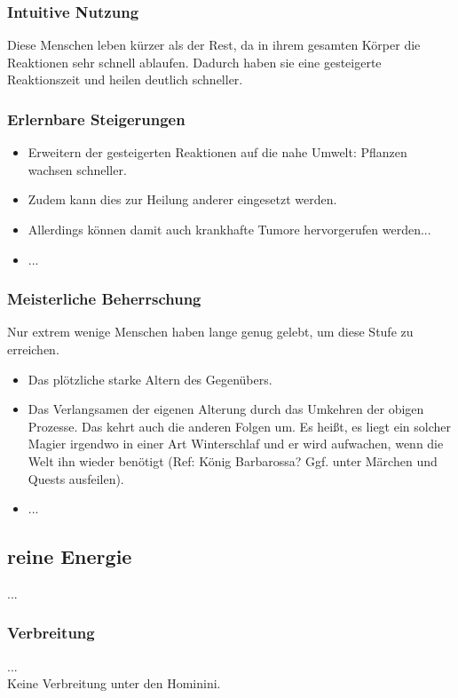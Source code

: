 \subsubsection{Intuitive Nutzung}
Diese Menschen leben kürzer als der Rest, da in ihrem gesamten Körper die Reaktionen sehr schnell ablaufen. Dadurch haben sie eine gesteigerte Reaktionszeit und heilen deutlich schneller.

\subsubsection{Erlernbare Steigerungen}
\begin{itemize}
	\item Erweitern der gesteigerten Reaktionen auf die nahe Umwelt: Pflanzen wachsen schneller.
	\item Zudem kann dies zur Heilung anderer eingesetzt werden.
	\item Allerdings können damit auch krankhafte Tumore hervorgerufen werden... 
	\item ...
\end{itemize}

\subsubsection{Meisterliche Beherrschung} 
Nur extrem wenige Menschen haben lange genug gelebt, um diese Stufe zu erreichen.
\begin{itemize}
	\item Das plötzliche starke Altern des Gegenübers.
	\item Das Verlangsamen der eigenen Alterung durch das Umkehren der obigen Prozesse. Das kehrt auch die anderen Folgen um. Es heißt, es liegt ein solcher Magier irgendwo in einer Art Winterschlaf und er wird aufwachen, wenn die Welt ihn wieder benötigt (Ref: König Barbarossa? Ggf. unter Märchen und Quests ausfeilen). %
	\item ...
\end{itemize}



\subsection{reine Energie}\label{sec:energiemagie}
...

\subsubsection{Verbreitung}
...\\
Keine Verbreitung unter den Hominini.

